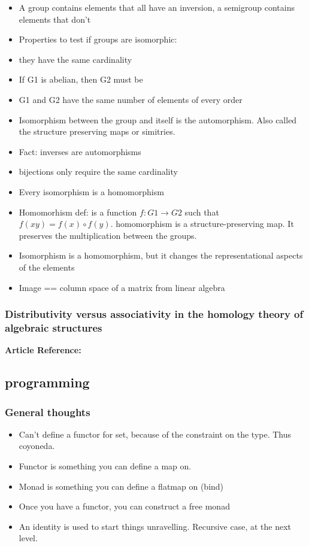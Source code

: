 \documentclass{article}
\begin{document}
\begin{itemize}
  \item A group contains elements that all have an inversion, a semigroup contains elements that don't
  \item Properties to test if groups are isomorphic: 
    \item they have the same cardinality
    \item If G1 is abelian, then G2 must be
    \item G1 and G2 have the same number of elements of every order
  \item Isomorphism between the group and itself is the automorphism. Also called the structure preserving maps or simitries.
  \item Fact: inverses are automorphisms
  \item bijections only require the same cardinality
  \item Every isomorphism is a homomorphism
  \item Homomorhism def: is a function $f: G1 \rightarrow G2$ such that $f(xy) = f(x) \circ f(y)$. homomorphism is a structure-preserving map. It preserves the multiplication between the groups. 
  \item Isomorphism is a homomorphism, but it changes the representational aspects of the elements
  \item Image == column space of a matrix from linear algebra
  
\end{itemize}

\subsubsection{Distributivity versus associativity in the homology theory of algebraic structures}

\textbf{Article Reference:} \cite{2011arXiv1109.4850P}

\subsection{programming}

\subsubsection{General thoughts}

\begin{itemize}
  \item Can't define a functor for set, because of the constraint on the type. Thus coyoneda. 
  \item Functor is something you can define a map on. 
  \item Monad is something you can define a flatmap on (bind)
  \item Once you have a functor, you can construct a free monad
  \item An identity is used to start things unravelling. Recursive case, at the next level. 
\end{itemize}
\end{document}
